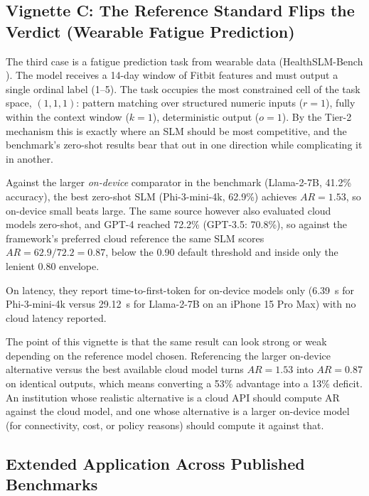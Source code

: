 \documentclass[11pt]{article}
\begin{document}
\subsection{Vignette C: The Reference Standard Flips the Verdict (Wearable Fatigue Prediction)}
\label{sec:vignette-c}

The third case is a fatigue prediction task from wearable data (HealthSLM-Bench \cite{Wang2025}). The model receives a 14-day window of Fitbit features and must output a single ordinal label (1--5). The task occupies the most constrained cell of the task space, $(1,1,1)$: pattern matching over structured numeric inputs ($r=1$), fully within the context window ($k=1$), deterministic output ($o=1$). By the Tier-2 mechanism this is exactly where an SLM should be most competitive, and the benchmark's zero-shot results bear that out in one direction while complicating it in another.

Against the larger \emph{on-device} comparator in the benchmark (Llama-2-7B, 41.2\% accuracy), the best zero-shot SLM (Phi-3-mini-4k, 62.9\%) achieves $AR = 1.53$, so on-device small beats large. The same source however also evaluated cloud models zero-shot, and GPT-4 reached 72.2\% (GPT-3.5: 70.8\%), so against the framework's preferred cloud reference the same SLM scores $AR = 62.9/72.2 = 0.87$, below the 0.90 default threshold and inside only the lenient 0.80 envelope.

On latency, they report time-to-first-token for on-device models only (6.39~s for Phi-3-mini-4k versus 29.12~s for Llama-2-7B on an iPhone 15 Pro Max) with no cloud latency reported.

The point of this vignette is that the same result can look strong or weak depending on the reference model chosen. Referencing the larger on-device alternative versus the best available cloud model turns $AR = 1.53$ into $AR = 0.87$ on identical outputs, which means converting a 53\% advantage into a 13\% deficit. An institution whose realistic alternative is a cloud API should compute AR against the cloud model, and one whose alternative is a larger on-device model (for connectivity, cost, or policy reasons) should compute it against that.

\subsection{Extended Application Across Published Benchmarks}
\label{sec:extended}
\end{document}
